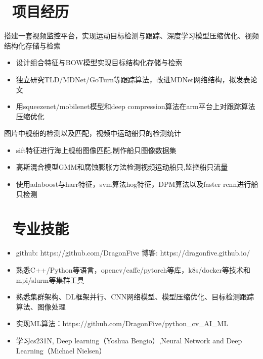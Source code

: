 \documentclass{resume}
\begin{document}
\section{\faCogs\ 项目经历}
搭建一套视频监控平台，实现运动目标检测与跟踪、深度学习模型压缩优化、视频结构化存储与检索
\begin{itemize}
  \item 设计组合特征与BOW模型实现目标结构化存储与检索
  \item 独立研究TLD/MDNet/GoTurn等跟踪算法，改进MDNet网络结构，拟发表论文
  \item 用squeezenet/mobilenet模型和deep compression算法在arm平台上对跟踪算法压缩优化
\end{itemize}


图片中舰船的检测以及匹配，视频中运动船只的检测统计
\begin{itemize}
  \item sift特征进行海上舰船图像匹配,制作船只图像数据集
  \item 高斯混合模型GMM和腐蚀膨胀方法检测视频运动船只,监控船只流量
  \item 使用adaboost与harr特征，svm算法hog特征，DPM算法以及faster rcnn进行船只检测
\end{itemize}




\section{\faInfo\ 专业技能}
\begin{itemize}[parsep=0.5ex]
  \item github: https://github.com/DragonFive 博客: https://dragonfive.github.io/
  \item 熟悉C++/Python等语言，opencv/caffe/pytorch等库，k8s/docker等技术和mpi/slurm等集群工具
  \item 熟悉集群架构、DL框架并行、CNN网络模型、模型压缩优化、目标检测跟踪算法、图像处理
  \item 实现ML算法：https://github.com/DragonFive/python\_cv\_AI\_ML 
  \item 学习cs231N, Deep learning（Yoshua Bengio）,Neural Network and Deep Learning（Michael Nielsen）
\end{itemize}

%
%
\end{document}
